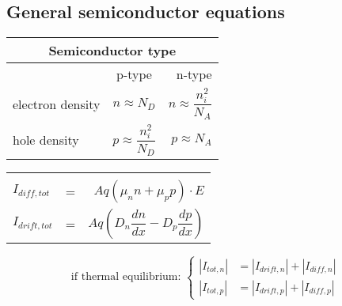 \documentclass{article}
\begin{document}
\subsection*{General semiconductor equations}
\begin{minipage}[t]{0.5\linewidth}
\vspace{0pt}
\setlength{\fboxsep}{0pt}
\setlength{\fboxrule}{0.5pt}
\hfill
\begin{minipage}[t]{0.7\linewidth}
\vspace{0pt}
\centering
\begin{tabular}{lcr}
    \multicolumn{3}{c}{Semiconductor type} \\
    \toprule
    & p-type & n-type \\
    \midrule
    electron density & $n\approx N_D$ & $n\approx\dfrac{n_i^2}{N_A}$ \\[0.4cm]
    hole density     & $p\approx\dfrac{n_i^2}{N_D}$ & $p\approx N_A$ \\[0.4cm]
    \bottomrule
\end{tabular}
\end{minipage}

\begin{minipage}[t]{\textwidth}
\vspace{16pt}
\centering
\begin{tabular}{lcr}
    \toprule
    \\[-8pt]
    $I_{diff,tot}$ &=& $Aq(\mu_n n+\mu_p p)\cdot E$ \\[0.4cm]
    $I_{drift,tot}$ &=& $Aq\left(D_n\dfrac{dn}{dx}-D_p\dfrac{dp}{dx}\right)$ \\[0.4cm]
    \bottomrule
\end{tabular}
\vspace{10pt}
$$
    \mbox{if thermal equilibrium: }
    \left\{
        \begin{array}{ll}
            |I_{tot,n}| &= |I_{drift,n}|+|I_{diff,n}| \\[0.4cm]
            |I_{tot,p}| &= |I_{drift,p}|+|I_{diff,p}|
        \end{array}
    \right.
$$
\end{minipage}
\end{minipage}
\end{document}
